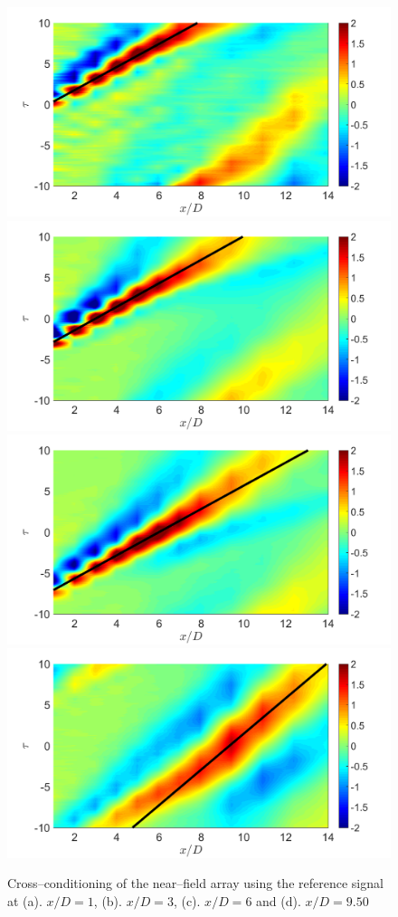 \begin{figure}
	\centering
		\includegraphics[width=0.45\linewidth]{Figures/conditioning/crossCondSt0p05X1DU0p7060.png} %
		\includegraphics[width=0.45\linewidth]{Figures/conditioning/crossCondSt0p05X3DU0p6962.png}\\
		\includegraphics[width=0.45\linewidth]{Figures/conditioning/crossCondSt0p05X6DU0p7054.png} %
		\includegraphics[width=0.45\linewidth]{Figures/conditioning/crossCondSt0p05X9p5DU0p4585.png}
	\caption{Cross--conditioning of the near--field array using the reference signal at (a). $x/D = 1$, (b). $x/D=3$, (c). $x/D=6$ and (d). $x/D=9.50$}
	\label{fig:crossCondSt0p15}
\end{figure}
